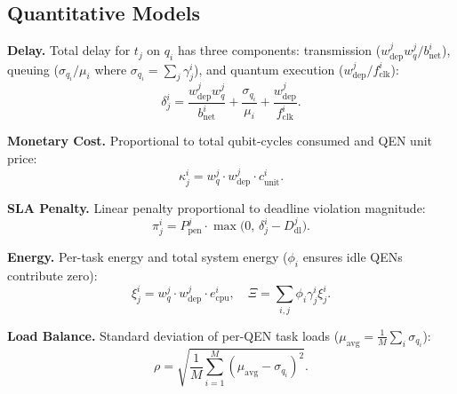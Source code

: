 \documentclass[10pt,twocolumn]{article}
\begin{document}
\subsection{Quantitative Models}

\textbf{Delay.} Total delay for $t_j$ on $q_i$ has three components: transmission ($w^j_{\mathrm{dep}}w^j_q/b^i_{\mathrm{net}}$), queuing ($\sigma_{q_i}/\mu_i$ where $\sigma_{q_i}=\sum_j\gamma^i_j$), and quantum execution ($w^j_{\mathrm{dep}}/f^i_{\mathrm{clk}}$):
\begin{equation}
\delta^i_j=\frac{w^j_{\mathrm{dep}}w^j_q}{b^i_{\mathrm{net}}}+\frac{\sigma_{q_i}}{\mu_i}+\frac{w^j_{\mathrm{dep}}}{f^i_{\mathrm{clk}}}.
\label{eq:delay}
\end{equation}

\textbf{Monetary Cost.} Proportional to total qubit-cycles consumed and QEN unit price:
\begin{equation}
\kappa^i_j=w^j_q\cdot w^j_{\mathrm{dep}}\cdot c^i_{\mathrm{unit}}.
\label{eq:cost}
\end{equation}

\textbf{SLA Penalty.} Linear penalty proportional to deadline violation magnitude:
\begin{equation}
\pi^i_j=P^j_{\mathrm{pen}}\cdot\max\!\bigl(0,\,\delta^i_j-D^j_{\mathrm{dl}}\bigr).
\label{eq:penalty}
\end{equation}

\textbf{Energy.} Per-task energy and total system energy ($\phi_i$ ensures idle QENs contribute zero):
\begin{equation}
\xi^i_j=w^j_q\cdot w^j_{\mathrm{dep}}\cdot e^i_{\mathrm{cpu}},\quad \Xi=\sum_{i,j}\phi_i\gamma^i_j\xi^i_j.
\label{eq:energy}
\end{equation}

\textbf{Load Balance.} Standard deviation of per-QEN task loads ($\mu_{\mathrm{avg}}=\frac{1}{M}\sum_i\sigma_{q_i}$):
\begin{equation}
\rho=\sqrt{\frac{1}{M}\sum_{i=1}^{M}(\mu_{\mathrm{avg}}-\sigma_{q_i})^2}.
\label{eq:lb}
\end{equation}
\end{document}
